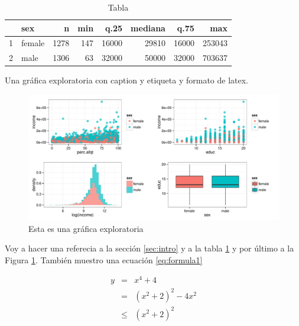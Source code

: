 \documentclass[12pt]{article}\usepackage[]{graphicx}\usepackage[]{color}
\makeatletter
\def\maxwidth{ %
  \ifdim\Gin@nat@width>\linewidth
    \linewidth
  \else
    \Gin@nat@width
  \fi
}
\newenvironment{knitrout}{}{} %
\makeatother
\begin{document}
\begin{table}[ht]
\centering
\begin{tabular}{rlrrrrrr}
  \hline
 & sex & n & min & q.25 & mediana & q.75 & max \\ 
  \hline
1 & female & 1278 & 147 & 16000 & 29810 & 16000 & 253043 \\ 
  2 & male & 1306 & 63 & 32000 & 50000 & 32000 & 703637 \\ 
   \hline
\end{tabular}
\caption{Tabla} 
\label{tab:Tabla1}
\end{table}


Una gráfica exploratoria con caption y etiqueta y formato de latex. 

\begin{knitrout}
\color{fgcolor}\begin{figure}

{\centering \includegraphics[width=\maxwidth]{figure/2_eda_plot-1} 

}

\caption[Esta es una gráfica exploratoria]{Esta es una gráfica exploratoria}\label{fig:2_eda_plot}
\end{figure}


\end{knitrout}

Voy a hacer una referecia a la sección \ref{sec:intro} y a la tabla \ref{tab:Tabla1} y por último a la Figura \ref{fig:2_eda_plot}. También muestro una ecuación \ref{eq:formula1}

\begin{eqnarray}
 y &=& x^4 + 4      \nonumber \\
   &=& (x^2+2)^2 -4x^2 \nonumber \\
   &\le&(x^2+2)^2
   \label{eq:formula1}
\end{eqnarray}
\end{document}
